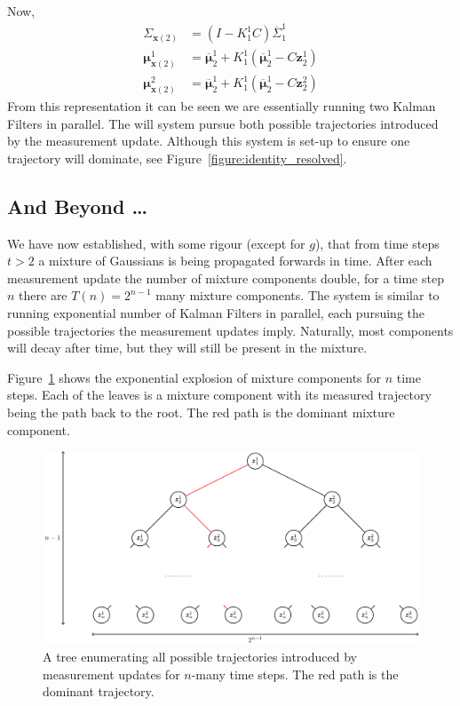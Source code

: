 Now,
\begin{align}
\Sigma_{\pmb{x}(2)}&= \left( I - K_{1}^{1} C \right) \overline{\Sigma}_{1}^{1} \\
\pmb{\mu}_{\pmb{x}(2)}^{1} &= \overline{\pmb{\mu}}_{2}^{1} + K_{1}^{1} \left( \overline{\pmb{\mu}}_{2}^{1} - C \pmb{z}_{2}^{1} \right) \\
\pmb{\mu}_{\pmb{x}(2)}^{2} &= \overline{\pmb{\mu}}_{2}^{1} + K_{1}^{1} \left( \overline{\pmb{\mu}}_{2}^{1} - C \pmb{z}_{2}^{2} \right) 
\end{align}
From this representation it can be seen we are essentially running two Kalman Filters in parallel. The will system pursue both possible trajectories introduced by the measurement update. Although this system is set-up to ensure one trajectory will dominate, see Figure~\ref{figure:identity_resolved}.

\subsection{And Beyond \dots}
\label{subsection:beyond}
We have now established, with some rigour (except for $g$), that from time steps $t>2$ a mixture of Gaussians is being propagated forwards in time. After each measurement update the number of mixture components double, for a time step $n$ there are $T(n) = 2^{n-1}$ many mixture components. The system is similar to running exponential number of Kalman Filters in parallel, each pursuing the possible trajectories the measurement updates imply. Naturally, most components will decay after time, but they will still be present in the mixture.

Figure~\ref{figure:binary_tree} shows the exponential explosion of mixture components for $n$ time steps. Each of the leaves is a mixture component with its measured trajectory being the path back to the root. The red path is the dominant mixture component.
\begin{figure}[!ht]
	\centering
	\includegraphics[scale=0.625]{tikz/binary_tree}
	\caption[An enumeration of all possible trajectories.]{A tree enumerating all possible trajectories introduced by measurement updates for $n$-many time steps. The red path is the dominant trajectory.}
	\label{figure:binary_tree}
\end{figure}


